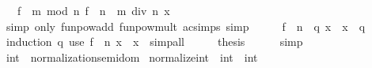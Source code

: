 \begin{isabellebody}
\ {\isacartoucheopen}{\isasymdots}\ {\isacharequal}{\kern0pt}\ {\isacharparenleft}{\kern0pt}f\ {\isacharcircum}{\kern0pt}{\isacharcircum}{\kern0pt}\ {\isacharparenleft}{\kern0pt}m\ mod\ n{\isacharparenright}{\kern0pt}{\isacharparenright}{\kern0pt}\ {\isacharparenleft}{\kern0pt}{\isacharparenleft}{\kern0pt}{\isacharparenleft}{\kern0pt}f\ {\isacharcircum}{\kern0pt}{\isacharcircum}{\kern0pt}\ n{\isacharparenright}{\kern0pt}\ {\isacharcircum}{\kern0pt}{\isacharcircum}{\kern0pt}\ {\isacharparenleft}{\kern0pt}m\ div\ n{\isacharparenright}{\kern0pt}{\isacharparenright}{\kern0pt}\ x{\isacharparenright}{\kern0pt}{\isacartoucheclose}\isanewline
\ \ \ \ \isamarkupfalse%
\ {\isacharparenleft}{\kern0pt}simp\ only{\isacharcolon}{\kern0pt}\ funpow{\isacharunderscore}{\kern0pt}add\ funpow{\isacharunderscore}{\kern0pt}mult\ ac{\isacharunderscore}{\kern0pt}simps{\isacharparenright}{\kern0pt}\ simp\isanewline
\ \ \isamarkupfalse%
\ \isamarkupfalse%
\ {\isacartoucheopen}{\isacharparenleft}{\kern0pt}{\isacharparenleft}{\kern0pt}f\ {\isacharcircum}{\kern0pt}{\isacharcircum}{\kern0pt}\ n{\isacharparenright}{\kern0pt}\ {\isacharcircum}{\kern0pt}{\isacharcircum}{\kern0pt}\ q{\isacharparenright}{\kern0pt}\ x\ {\isacharequal}{\kern0pt}\ x{\isacartoucheclose}\ \ q\isanewline
\ \ \ \ \isamarkupfalse%
\ {\isacharparenleft}{\kern0pt}induction\ q{\isacharparenright}{\kern0pt}\ {\isacharparenleft}{\kern0pt}use\ {\isacartoucheopen}{\isacharparenleft}{\kern0pt}f\ {\isacharcircum}{\kern0pt}{\isacharcircum}{\kern0pt}\ n{\isacharparenright}{\kern0pt}\ x\ {\isacharequal}{\kern0pt}\ x{\isacartoucheclose}\ \ simp{\isacharunderscore}{\kern0pt}all{\isacharparenright}{\kern0pt}\isanewline
\ \ \isamarkupfalse%
\ \isamarkupfalse%
\ {\isacharquery}{\kern0pt}thesis\isanewline
\ \ \ \ \isamarkupfalse%
\ simp\isanewline
{}\isamarkupfalse%
%
\endisatagproof
{\isafoldproof}%
%
\isadelimproof
%
\endisadelimproof
%
\isadelimdocument
%
\endisadelimdocument
%
\isatagdocument
%
\isamarkuptrue%
%
\endisatagdocument
{\isafolddocument}%
%
\isadelimdocument
%
\endisadelimdocument
{}\isamarkupfalse%
\ int\ {\isacharcolon}{\kern0pt}{\isacharcolon}{\kern0pt}\ normalization{\isacharunderscore}{\kern0pt}semidom\isanewline
{}\isanewline
\isanewline
{}\isamarkupfalse%
\ normalize{\isacharunderscore}{\kern0pt}int\ {\isacharcolon}{\kern0pt}{\isacharcolon}{\kern0pt}\ {\isachardoublequoteopen}int\ {\isasymRightarrow}\ int{\isachardoublequoteclose}\isanewline

\end{isabellebody}
